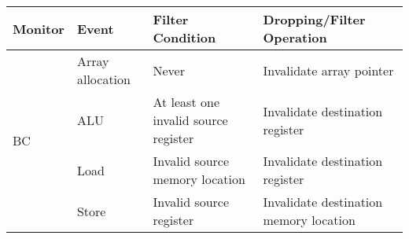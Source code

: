 

\begin{tabular}{|l|l|l|l|}
\hline

{\bf Monitor} & {\bf Event} & {\bf Filter Condition} & {\bf Dropping/Filter Operation} \\ \hline \hline

\multirow{4}{*}{BC}  
& Array allocation & Never & Invalidate array pointer \\ \cline{2-4}
& ALU   & At least one invalid source register & Invalidate destination register \\ \cline{2-4}
& Load  & Invalid source memory location & Invalidate destination register \\ \cline{2-4}
& Store & Invalid source register & Invalidate destination memory location \\
\hline%

% 


\end{tabular}
